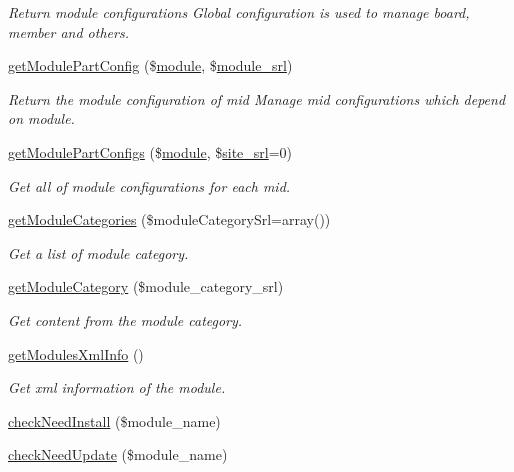 \begin{DoxyCompactItemize}
\begin{DoxyCompactList}\small\item\em Return module configurations Global configuration is used to manage board, member and others. \end{DoxyCompactList}\item 
\hyperlink{classmoduleModel_acfd93d46c26d88c3833b0801085e69ba}{get\+Module\+Part\+Config} (\$\hyperlink{classmodule}{module}, \$\hyperlink{ko_8install_8php_a370bb6450fab1da3e0ed9f484a38b761}{module\+\_\+srl})
\begin{DoxyCompactList}\small\item\em Return the module configuration of mid Manage mid configurations which depend on module. \end{DoxyCompactList}\item 
\hyperlink{classmoduleModel_a3e50f170f709853c8adf5c8f759e08ca}{get\+Module\+Part\+Configs} (\$\hyperlink{classmodule}{module}, \$\hyperlink{ko_8install_8php_a8b1406b4ad1048041558dce6bfe89004}{site\+\_\+srl}=0)
\begin{DoxyCompactList}\small\item\em Get all of module configurations for each mid. \end{DoxyCompactList}\item 
\hyperlink{classmoduleModel_a253e39c41e241e2f3fa914ce5d915963}{get\+Module\+Categories} (\$module\+Category\+Srl=array())
\begin{DoxyCompactList}\small\item\em Get a list of module category. \end{DoxyCompactList}\item 
\hyperlink{classmoduleModel_a75669086647f78470306c840c22f36b1}{get\+Module\+Category} (\$module\+\_\+category\+\_\+srl)
\begin{DoxyCompactList}\small\item\em Get content from the module category. \end{DoxyCompactList}\item 
\hyperlink{classmoduleModel_ab0740093a121db65a8d65777fdcd8f00}{get\+Modules\+Xml\+Info} ()
\begin{DoxyCompactList}\small\item\em Get xml information of the module. \end{DoxyCompactList}\item 
\hyperlink{classmoduleModel_a0a2303f1634b4937509e9b21e811d1ad}{check\+Need\+Install} (\$module\+\_\+name)
\item 
\hyperlink{classmoduleModel_adb7f7c6facce819f69ae5e29db2018cc}{check\+Need\+Update} (\$module\+\_\+name)

\end{DoxyCompactItemize}
